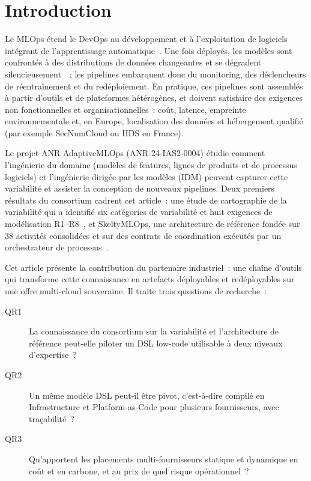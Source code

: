 \documentclass[10pt,a4paper]{article}
\begin{document}
\section{Introduction}
Le MLOps étend le DevOps au développement et à l'exploitation de logiciels intégrant
de l'apprentissage automatique~\cite{kreuzberger2023,sculley2015}. Une fois déployés,
les modèles sont confrontés à des distributions de données changeantes et se
dégradent silencieusement~\cite{gama2014}~; les pipelines embarquent donc du
monitoring, des déclencheurs de réentraînement et du redéploiement. En pratique, ces
pipelines sont assemblés à partir d'outils et de plateformes hétérogènes, et doivent
satisfaire des exigences non fonctionnelles et organisationnelles~: coût, latence,
empreinte environnementale et, en Europe, localisation des données et hébergement
qualifié (par exemple SecNumCloud ou HDS en France).

Le projet ANR AdaptiveMLOps (ANR-24-IAS2-0004) étudie comment l'ingénierie du
domaine (modèles de features, lignes de produits et de processus logiciels) et
l'ingénierie dirigée par les modèles (IDM) peuvent capturer cette variabilité et
assister la conception de nouveaux pipelines. Deux premiers résultats du consortium
cadrent cet article~: une étude de cartographie de la variabilité qui a identifié six
catégories de variabilité et huit exigences de modélisation R1--R8~\cite{elhatimi2025},
et SkeltyMLOps, une architecture de référence fondée sur 38 activités consolidées et
sur des contrats de coordination exécutés par un orchestrateur de
processus~\cite{daoud2025,daoud2026}.

Cet article présente la contribution du partenaire industriel~: une chaîne d'outils
qui transforme cette connaissance en artefacts déployables et redéployables sur une
offre multi-cloud souveraine. Il traite trois questions de recherche~:
\begin{description}
\item[QR1] La connaissance du consortium sur la variabilité et l'architecture de
référence peut-elle piloter un DSL low-code utilisable à deux niveaux d'expertise~?
\item[QR2] Un même modèle DSL peut-il être pivot, c'est-à-dire compilé en
Infrastructure et Platform-as-Code pour plusieurs fournisseurs, avec traçabilité~?
\item[QR3] Qu'apportent les placements multi-fournisseurs statique et dynamique en
coût et en carbone, et au prix de quel risque opérationnel~?
\end{description}
\end{document}
